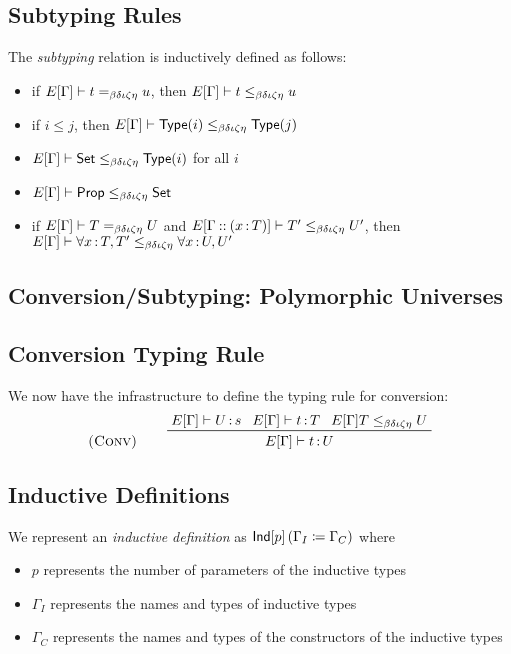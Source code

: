 \documentclass{article}
\begin{document}
\subsection{Subtyping Rules}
The \emph{subtyping} relation is inductively defined as follows:
\begin{itemize}
\item if $E[\Gamma] \vdash t =_{\beta\delta\iota\zeta\eta} u$, then $E[\Gamma] \vdash t \leq_{\beta\delta\iota\zeta\eta} u$
\item if $i \leq j$, then $E[\Gamma] \vdash \mathsf{Type}(i) \leq_{\beta\delta\iota\zeta\eta} \mathsf{Type}(j)$
\item $E[\Gamma] \vdash \mathsf{Set} \leq_{\beta\delta\iota\zeta\eta} \mathsf{Type}(i)$ for all $i$
\item $E[\Gamma] \vdash \mathsf{Prop} \leq_{\beta\delta\iota\zeta\eta} \mathsf{Set}$
\item if $E[\Gamma] \vdash T =_{\beta\delta\iota\zeta\eta} U$ and
  $E[\Gamma \mathbin{::} (x {\,:\,} T)] \vdash T' \leq_{\beta\delta\iota\zeta\eta} U'$, then
  $E[\Gamma] \vdash \forall x {\,:\,} T , T' \leq_{\beta\delta\iota\zeta\eta} \forall x {\,:\,} U , U'$
\end{itemize}

\subsection{Conversion/Subtyping: Polymorphic Universes}

\subsection{Conversion Typing Rule}
We now have the infrastructure to define the typing rule for conversion:
\[
\prule{Conv}\hspace{5ex}
\prftree
{E[\Gamma] \vdash \lasm{U}{s}}
{E[\Gamma] \vdash \lasm{t}{T}}
{E[\Gamma] T \subty U}
{E[\Gamma] \vdash \lasm{t}{U}}
\]

\subsection{Inductive Definitions}
\begin{definition}
We represent an \emph{inductive definition} as $\mathsf{Ind}[p]\left(\Gamma_I \coloneqq \Gamma_C\right)$ where
\begin{itemize}
\item $p$ represents the number of parameters of the inductive types
\item $\Gamma_I$ represents the names and types of inductive types
\item $\Gamma_C$ represents the names and types of the constructors of the inductive types
\end{itemize}
\end{definition}
\end{document}
